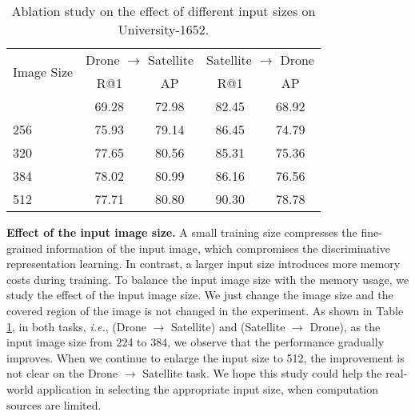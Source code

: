 \documentclass[journal]{IEEEtran}
\def\ie{\emph{i.e.}}
\begin{document}
\setlength{\tabcolsep}{10pt}
\begin{table}[htp]
\small
\caption{Ablation study on the effect of different input sizes on University-1652. 
}
\begin{center}
\begin{tabular}{l|cc|cc}
\hline
\multirow{2}{*}{Image Size}& \multicolumn{2}{c|}{Drone $\rightarrow$ Satellite} & \multicolumn{2}{c}{Satellite $\rightarrow$ Drone}\\
  & R@1 & AP & R@1 & AP\\
\shline
224 & 69.28 & 72.98 & 82.45 & 68.92 \\
256 & 75.93 & 79.14 & 86.45 & 74.79 \\
320 & 77.65 & 80.56 & 85.31 & 75.36 \\
384 & 78.02 & 80.99 & 86.16 & 76.56 \\
512 & 77.71 & 80.80 & 90.30 & 78.78 \\
\hline
\end{tabular}
\end{center}
\label{table:Size}
\end{table}

\textbf{Effect of the input image size.}
A small training size compresses the fine-grained information of the input image, which compromises the discriminative representation learning. In contrast, a larger input size introduces more memory costs during training. 
To balance the input image size with the memory usage, we study the effect of the input image size. We just change the image size and the covered region of the image is not changed in the experiment. As shown in Table \ref{table:Size}, in both tasks, \ie, (Drone $\rightarrow$ Satellite) and (Satellite $\rightarrow$ Drone), as the input image size from 224 to 384, we observe that the performance gradually improves. When we continue to enlarge the input size to 512, the improvement is not clear on the Drone $\rightarrow$ Satellite task. We hope this study could help the real-world application in selecting the appropriate input size, when computation sources are limited.  
\end{document}
